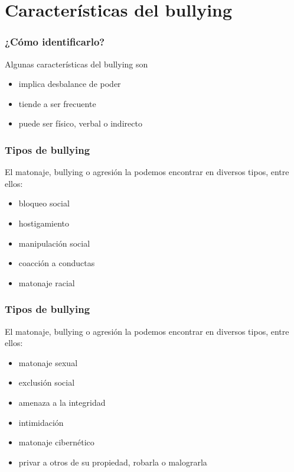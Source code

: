 \documentclass[12pt,spanish,x11names,svgnames]{beamer}
\begin{document}
\section{Características del bullying}
\begin{frame}
  \frametitle{¿Cómo identificarlo?}
  \begin{block}{Algunas características del bullying son}
    \pause
    \begin{itemize}
    \item<+-> implica desbalance de poder
    \item<+-> tiende a ser frecuente
    \item<+-> puede ser físico, verbal o indirecto
    \end{itemize}
  \end{block}
\end{frame}
\begin{frame}
  \frametitle{Tipos de bullying}
  \begin{exampleblock}{El matonaje, bullying o agresión la podemos encontrar en diversos tipos, entre ellos:}
    \pause
    \begin{itemize}
    \item<+-> bloqueo social
    \item<+-> hostigamiento
    \item<+-> manipulación social
    \item<+-> coacción a conductas
    \item<+-> matonaje racial
    \end{itemize}
  \end{exampleblock}
\end{frame}
\begin{frame}
  \frametitle{Tipos de bullying}
  \begin{exampleblock}{El matonaje, bullying o agresión la podemos encontrar en diversos tipos, entre ellos:}
    \begin{itemize}
    \item<+-> matonaje sexual
    \item<+-> exclusión social
    \item<+-> amenaza a la integridad
    \item<+-> intimidación
    \item<+-> matonaje cibernético
    \item<+-> privar a otros de su propiedad, robarla o malograrla
    \end{itemize}
  \end{exampleblock}
\end{frame}
\end{document}
